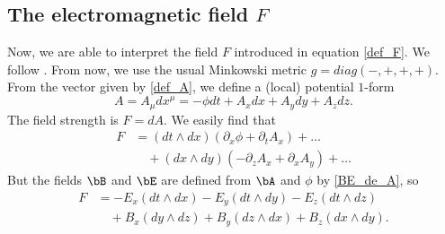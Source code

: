 \subsection{The electromagnetic field \texorpdfstring{$F$}{F}}
Now, we are able to interpret the field $F$ introduced in equation \eqref{def_F}.  We follow \cite{Preparation}. From now, we use the usual Minkowski metric $g=diag(-,+,+,+)$.
From the vector given by \eqref{def_A}, we define a (local) potential $1$-form
\[
   A=A_{\mu}dx^{\mu}=-\phi dt+A_x dx+A_y dy+A_z dz.
\]
The field strength is $F=dA$. We easily find that
\begin{equation}
\begin{split}
   F&=(dt\wedge dx)(\partial_x\phi+\partial_t A_x)+\ldots\\
    &\quad+(dx\wedge dy)(-\partial_z A_x+\partial_x A_y)+\ldots
\end{split}
\end{equation}
But the fields $\bB$ and $\bE$ are defined from $\bA$ and $\phi$ by \eqref{BE_de_A}, so
\begin{equation}
\begin{split}
  F&=-E_x(dt\wedge dx)-E_y(dt\wedge dy)-E_z(dt\wedge dz)\\
   &\quad+B_x(dy\wedge dz)+B_y(dz\wedge dx)+B_z(dx\wedge dy).
\end{split}
\end{equation}


